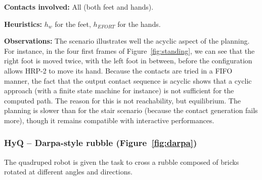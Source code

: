 \noindent\textbf{Contacts involved:} All (both feet and hands).

\noindent\textbf{Heuristics:} $h_w$ for the feet, $h_{EFORT}$  for the hands.

\noindent\textbf{Observations:} The scenario illustrates well the acyclic aspect of the planning. For instance, in the four first frames of Figure~\ref{fig:standing}, we can see that the right foot
is moved twice, with the left foot in between, before the configuration allows HRP-2 to move its hand.
Because the contacts are tried in a FIFO manner, the fact that the output contact sequence is acyclic shows that a cyclic approach (with a finite state machine for instance) is not sufficient
for the computed path. The reason for this is not reachability, but equilibrium. The planning is slower than for the stair scenario (because the contact generation fails more),
though it remains compatible with interactive performances. %





\subsubsection{HyQ -- Darpa-style rubble (Figure~\ref{fig:darpa})}
The quadruped robot is given the task to cross a rubble composed of bricks rotated at different angles and directions.

